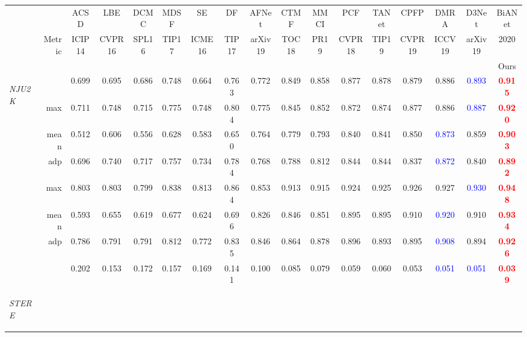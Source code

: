 \documentclass[journal]{IEEEtran}
\newcommand{\trb}[1]{\textbf{\textcolor{red}{#1}}}
\newcommand{\tbb}[1]{\textcolor{blue}{#1}}
\newcommand{\NJU}{\textit{NJU2K}~\cite{ju2014depth}}
\newcommand{\STERE}{\textit{STERE}~\cite{niu2012leveraging}}
\begin{document}
\begin{table*}[t!]
\begin{tabular}{lr|ccccc|ccccccccc|c}
		&  & ACSD & LBE & DCMC & MDSF   & SE   & DF   & AFNet& CTMF & MMCI & PCF   & TANet& CPFP & DMRA & D3Net & BiANet \\
		& Metric & \scriptsize{ICIP14} & \scriptsize{CVPR16} & \scriptsize{SPL16} & \scriptsize{TIP17}   & \scriptsize{ICME16}   & \scriptsize{TIP17}   & \scriptsize{arXiv19} & \scriptsize{TOC18} & \scriptsize{PR19} & \scriptsize{CVPR18}   & \scriptsize{TIP19} & \scriptsize{CVPR19} & \scriptsize{ICCV19} & \scriptsize{arXiv19} & \scriptsize{2020} \\
		&  & \cite{ju2014depth} & \cite{feng2016local} & \cite{cong2016saliency} & \cite{song2017depth} & \cite{guo2016salient} & \cite{qu2017rgbd} & \cite{wang2019adaptive} & \cite{han2017cnns} & \cite{chen2019multi} & \cite{chen2018progressively} & \cite{chen2019three}& \cite{zhao2019Contrast} & \cite{piao2019depth} & \cite{fan2019D3Net}& Ours\\
		\hline
		\multirow{8}{*}{\begin{sideways}\NJU\end{sideways}}
		&     & 0.699 & 0.695 & 0.686 & 0.748 & 0.664 & 0.763 & 0.772 & 0.849 & 0.858 & 0.877 & 0.878 & 0.879 & 0.886 & \tbb{0.893} & \trb{0.915} \\
		& max      & 0.711 & 0.748 & 0.715 & 0.775 & 0.748 & 0.804 & 0.775 & 0.845 & 0.852 & 0.872 & 0.874 & 0.877 & 0.886 & \tbb{0.887} & \trb{0.920} \\
		& mean      & 0.512 & 0.606 & 0.556 & 0.628 & 0.583 & 0.650 & 0.764 & 0.779 & 0.793 & 0.840 & 0.841 & 0.850 & \tbb{0.873} & 0.859 & \trb{0.903} \\
		& adp      & 0.696 & 0.740 & 0.717 & 0.757 & 0.734 & 0.784 & 0.768 & 0.788 & 0.812 & 0.844 & 0.844 & 0.837 & \tbb{0.872} & 0.840 & \trb{0.892} \\
		& max        & 0.803 & 0.803 & 0.799 & 0.838 & 0.813 & 0.864 & 0.853 & 0.913 & 0.915 & 0.924 & 0.925 & 0.926 & 0.927 & \tbb{0.930} & \trb{0.948} \\
		& mean      & 0.593 & 0.655 & 0.619 & 0.677 & 0.624 & 0.696 & 0.826 & 0.846 & 0.851 & 0.895 & 0.895 & 0.910 & \tbb{0.920} & 0.910 & \trb{0.934} \\
		& adp      & 0.786 & 0.791 & 0.791 & 0.812 & 0.772 & 0.835 & 0.846 & 0.864 & 0.878 & 0.896 & 0.893 & 0.895 & \tbb{0.908} & 0.894 & \trb{0.926} \\
		&  & 0.202 & 0.153 & 0.172 & 0.157 & 0.169 & 0.141 & 0.100 & 0.085 & 0.079 & 0.059 & 0.060 & 0.053 & \tbb{0.051} & \tbb{0.051} & \trb{0.039} \\
		\midrule
		\multirow{8}{*}{\begin{sideways}\STERE\end{sideways}}

\end{tabular}
\end{table*}
\end{document}
